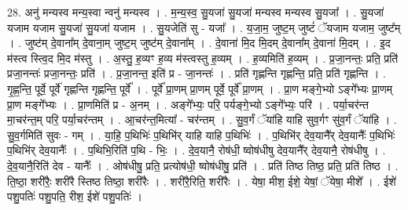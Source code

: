 \documentclass[17pt]{extarticle}
\begin{document}
28. अनु॑ मन्यस्व मन्य॒स्वा न्वनु॑ मन्यस्व । . म॒न्य॒स्व॒ सु॒यजा॑ सु॒यजा॑ मन्यस्व मन्यस्व सु॒यजा᳚ । . सु॒यजा॑ यजाम यजाम सु॒यजा॑ सु॒यजा॑ यजाम । . सु॒यजेति॑ सु - यजा᳚ । . य॒जा॒म॒ जुष्ट॒म् जुष्टं॑ ॅयजाम यजाम॒ जुष्ट᳚म् । . जुष्ट॑म् दे॒वाना᳚म् दे॒वाना॒म् जुष्ट॒म् जुष्ट॑म् दे॒वाना᳚म् । . दे॒वाना॑ मि॒द मि॒दम् दे॒वाना᳚म् दे॒वाना॑ मि॒दम् । . इ॒द म॑स्त्व स्त्वि॒द मि॒द म॑स्तु । . अ॒स्तु॒ ह॒व्यꣳ ह॒व्य म॑स्त्वस्तु ह॒व्यम् । . ह॒व्यमिति॑ ह॒व्यम् । . प्र॒जा॒नन्तः॒ प्रति॒ प्रति॑ प्रजा॒नन्तः॑ प्रजा॒नन्तः॒ प्रति॑ । . प्र॒जा॒नन्त॒ इति॑ प्र - जा॒नन्तः॑ । . प्रति॑ गृह्णन्ति गृह्णन्ति॒ प्रति॒ प्रति॑ गृह्णन्ति । . गृ॒ह्ण॒न्ति॒ पूर्वे॒ पूर्वे॑ गृह्णन्ति गृह्णन्ति॒ पूर्वे᳚ । . पूर्वे᳚ प्रा॒णम् प्रा॒णम् पूर्वे॒ पूर्वे᳚ प्रा॒णम् । . प्रा॒ण मङ्गे॒भ्यो ऽङ्गे᳚भ्यः प्रा॒णम् प्रा॒ण मङ्गे᳚भ्यः । . प्रा॒णमिति॑ प्र - अ॒नम् । . अङ्गे᳚भ्यः॒ परि॒ पर्यङ्गे॒भ्यो ऽङ्गे᳚भ्यः॒ परि॑ । . पर्या॒चर॑न्त मा॒चर॑न्त॒म् परि॒ पर्या॒चर॑न्तम् । . आ॒चर॑न्त॒मित्या᳚ - चर॑न्तम् । . सु॒व॒र्गं ॅया॑हि याहि सुव॒र्गꣳ सु॑व॒र्गं ॅया॑हि । . सु॒व॒र्गमिति॑ सुवः - गम् । . या॒हि॒ प॒थिभिः॑ प॒थिभि॑र् याहि याहि प॒थिभिः॑ । . प॒थिभि॑र् देव॒यानै᳚र् देव॒यानैः᳚ प॒थिभिः॑ प॒थिभि॑र् देव॒यानैः᳚ । . प॒थिभि॒रिति॑ प॒थि - भिः॒ । . दे॒व॒यानै॒ रोष॑धी॒ ष्वोष॑धीषु देव॒यानै᳚र् देव॒यानै॒ रोष॑धीषु । . दे॒व॒यानै॒रिति॑ देव - यानैः᳚ । . ओष॑धीषु॒ प्रति॒ प्रत्योष॑धी॒ ष्वोष॑धीषु॒ प्रति॑ । . प्रति॑ तिष्ठ तिष्ठ॒ प्रति॒ प्रति॑ तिष्ठ । . ति॒ष्ठा॒ शरी॑रैः॒ शरी॑रै स्तिष्ठ तिष्ठा॒ शरी॑रैः । . शरी॑रै॒रिति॒ शरी॑रैः । . येषा॒ मीश॒ ईशे॒ येषां॒ ॅयेषा॒ मीशे᳚ । . ईशे॑ पशु॒पतिः॑ पशु॒पति॒ रीश॒ ईशे॑ पशु॒पतिः॑ । \newline
\end{document}
